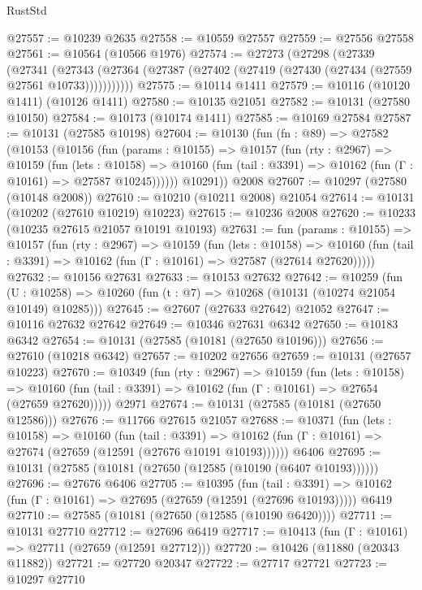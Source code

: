 \begin{lexlean}{RustStd}
\begin{coremodule}
@27557 := @10239 @2635
@27558 := @10559 @27557
@27559 := @27556 @27558
@27561 := @10564 (@10566 @1976)
@27574 := @27273
    (@27298
      (@27339
        (@27341
          (@27343 (@27364 (@27387 (@27402 (@27419 (@27430 (@27434 (@27559 @27561 @10733)))))))))))
@27575 := @10114 @1411
@27579 := @10116 (@10120 @1411) (@10126 @1411)
@27580 := @10135 @21051
@27582 := @10131 (@27580 @10150)
@27584 := @10173 (@10174 @1411)
@27585 := @10169 @27584
@27587 := @10131 (@27585 @10198)
@27604 := @10130
    (fun (fn : @89) =>
    @27582
      (@10153
        (@10156
          (fun (params : @10155) =>
          @10157
            (fun (rty : @2967) =>
            @10159
              (fun (lets : @10158) =>
              @10160 (fun (tail : @3391) => @10162 (fun (Γ : @10161) => @27587 @10245))))))
        @10291))
    @2008
@27607 := @10297 (@27580 (@10148 @2008))
@27610 := @10210 (@10211 @2008) @21054
@27614 := @10131 (@10202 (@27610 @10219) @10223)
@27615 := @10236 @2008
@27620 := @10233 (@10235 @27615 @21057 @10191 @10193)
@27631 := fun (params : @10155) =>
  @10157
    (fun (rty : @2967) =>
    @10159
      (fun (lets : @10158) =>
      @10160 (fun (tail : @3391) => @10162 (fun (Γ : @10161) => @27587 (@27614 @27620)))))
@27632 := @10156 @27631
@27633 := @10153 @27632
@27642 := @10259
    (fun (U : @10258) => @10260 (fun (t : @7) => @10268 (@10131 (@10274 @21054 @10149) @10285)))
@27645 := @27607 (@27633 @27642) @21052
@27647 := @10116 @27632 @27642
@27649 := @10346 @27631 @6342
@27650 := @10183 @6342
@27654 := @10131 (@27585 (@10181 (@27650 @10196)))
@27656 := @27610 (@10218 @6342)
@27657 := @10202 @27656
@27659 := @10131 (@27657 @10223)
@27670 := @10349
    (fun (rty : @2967) =>
    @10159
      (fun (lets : @10158) =>
      @10160 (fun (tail : @3391) => @10162 (fun (Γ : @10161) => @27654 (@27659 @27620)))))
    @2971
@27674 := @10131 (@27585 (@10181 (@27650 @12586)))
@27676 := @11766 @27615 @21057
@27688 := @10371
    (fun (lets : @10158) =>
    @10160
      (fun (tail : @3391) =>
      @10162 (fun (Γ : @10161) => @27674 (@27659 (@12591 (@27676 @10191 @10193))))))
    @6406
@27695 := @10131 (@27585 (@10181 (@27650 (@12585 (@10190 (@6407 @10193))))))
@27696 := @27676 @6406
@27705 := @10395
    (fun (tail : @3391) => @10162 (fun (Γ : @10161) => @27695 (@27659 (@12591 (@27696 @10193)))))
    @6419
@27710 := @27585 (@10181 (@27650 (@12585 (@10190 @6420))))
@27711 := @10131 @27710
@27712 := @27696 @6419
@27717 := @10413 (fun (Γ : @10161) => @27711 (@27659 (@12591 @27712)))
@27720 := @10426 (@11880 (@20343 @11882))
@27721 := @27720 @20347
@27722 := @27717 @27721
@27723 := @10297 @27710

\end{coremodule}
\end{lexlean}
